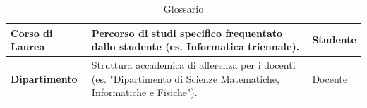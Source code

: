\begin{table}[h]
\begin{tabular}{|p{3cm}|p{7.5cm}|p{3.5cm}|}
        \hline
        \textbf{Corso di Laurea} & Percorso di studi specifico frequentato dallo studente (es. Informatica triennale). & Studente \\
        \hline
        \textbf{Dipartimento} & Struttura accademica di afferenza per i docenti (es. "Dipartimento di Scienze Matematiche, Informatiche e Fisiche"). & Docente \\
        \hline
    \end{tabular}
    \caption{Glossario}
    \label{tab:glossario}
\end{table}
